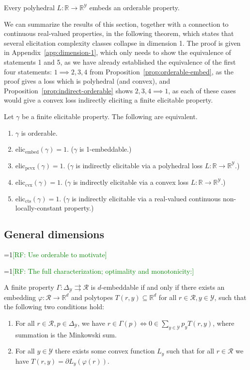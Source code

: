 \documentclass[11pt]{colt2019}
\newcommand{\Comments}{1}
\newcommand{\mynote}[2]{\ifnum\Comments=1\textcolor{#1}{#2}\fi}
\newcommand{\raf}[1]{\mynote{green}{[RF: #1]}}
\newcommand{\reals}{\mathbb{R}}
\newcommand{\eliccts}{\mathrm{elic}_\mathrm{cts}}
\newcommand{\eliccvx}{\mathrm{elic}_\mathrm{cvx}}
\newcommand{\elicpoly}{\mathrm{elic}_\mathrm{pcvx}}
\newcommand{\elicembed}{\mathrm{elic}_\mathrm{embed}}
\newcommand{\simplex}{\Delta_\Y}
\newcommand{\R}{\mathcal{R}}
\newcommand{\Y}{\mathcal{Y}}
\newcommand{\toto}{\rightrightarrows}
\begin{document}
\begin{corollary}\label{cor:embed-orderable}
  Every polyhedral $L : \reals \to \reals^\Y$ embeds an orderable property.
\end{corollary}

We can summarize the results of this section, together with a connection to continuous real-valued properties, in the following theorem, which states that several elicitation complexity classes collapse in dimension 1.
The proof is given in Appendix~\ref{app:dimension-1}, which only needs to show the equivalence of statements 1 and 5, as we have already established the equivalence of the first four statements: $1 \implies 2,3,4$ from Proposition~\ref{prop:orderable-embed}, as the proof gives a loss which is polyhedral (and convex), and Proposition~\ref{prop:indirect-orderable} shows $2,3,4 \implies 1$, as each of these cases would give a convex loss indirectly eliciting a finite elicitable property.
\begin{theorem}\label{thm:1d-tfae}
  Let $\gamma$ be a finite elicitable property.
  The following are equivalent.
  \begin{enumerate}
  \item $\gamma$ is orderable.
  \item $\elicembed(\gamma)=1$. ($\gamma$ is 1-embeddable.)
  \item $\elicpoly(\gamma)=1$. ($\gamma$ is indirectly elicitable via a polyhedral loss $L:\reals\to\reals^\Y$.)
  \item $\eliccvx(\gamma)=1$. ($\gamma$ is indirectly elicitable via a convex loss $L:\reals\to\reals^\Y$.)
  \item $\eliccts(\gamma)=1$. ($\gamma$ is indirectly elicitable via a real-valued continuous non-locally-constant property.)
  \end{enumerate}
\end{theorem}

\subsection{General dimensions}

\raf{Use orderable to motivate}

\raf{The full characterization; optimality and monotonicity:}
\begin{theorem}
  A finite property $\Gamma:\simplex\toto\R$ is $d$-embeddable if and only if there exists an embedding $\varphi: \R \to \reals^d$ and polytopes $T(r,y) \subseteq \reals^d$ for all $r\in\R, y\in\Y$, such that the following two conditions hold:
  \begin{enumerate}
  \item For all $r\in\R, p\in\simplex$, we have $r\in \Gamma(p) \iff 0 \in \sum_{y\in\Y} p_y T(r,y)$, where summation is the Minkowski sum.
  \item For all $y\in\Y$ there exists some convex function $L_y$ such that for all $r\in\R$ we have $T(r,y) = \partial L_y(\varphi(r))$.
  \end{enumerate}
\end{theorem}
\end{document}
